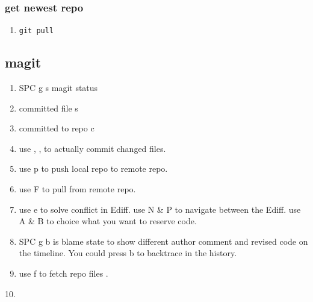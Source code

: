 \documentclass[11pt]{article}
\begin{document}
\subsubsection{get newest repo}
\label{sec:orge405ade}
\begin{enumerate}
\item \texttt{git pull}
\end{enumerate}

\subsection{magit}
\label{sec:org8826361}
\begin{enumerate}
\item SPC g s  magit status
\item committed file  s
\item committed to repo  c
\item use  , ,   to actually commit changed files.
\item use  p  to push local repo to remote repo.
\item use  F  to pull from remote repo.
\item use  e  to solve conflict in Ediff. 
use  N \& P  to navigate between the Ediff.
use  A \& B  to choice what you want to reserve code.
\item SPC g b  is blame state to show different
author comment and revised code on the timeline. You could press
 b  to backtrace in the history.
\item use  f  to fetch repo files \cite{remy2000using} .
\end{enumerate}
10.\cite{kosba2016hawk} 


\printbibliography[title=参考文献]
\end{document}
